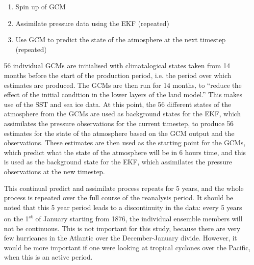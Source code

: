 \documentclass[pdftex,12pt,a4paper]{report}
\newcommand{\ts}{\textsuperscript}
\begin{document}
\begin{enumerate}
    \item Spin up of GCM
    \item Assimilate pressure data using the EKF (repeated)
    \item Use GCM to predict the state of the atmosphere at the next timestep (repeated)
\end{enumerate}

56 individual GCMs are initialised with climatalogical states taken from 14 months before the start
of the production period, i.e. the period over which estimates are produced. The GCMs are then run
for 14 months, to ``reduce the effect of the initial condition in the lower layers of the land
model.'' This makes use of the SST and sea ice data. At this point, the 56 different states of the
atmosphere from the GCMs are used as background states for the EKF, which assimilates the pressure
observations for the current timestep, to produce 56 estimates for the state of the atmosphere based
on the GCM output and the observations. These estimates are then used as the starting point for the
GCMs, which predict what the state of the atmosphere will be in 6 hours time, and this is used as
the background state for the EKF, which assimilates the pressure observations at the new timestep. 

This continual predict and assimilate process repeats for 5 years, and the whole process is repeated
over the full course of the reanalysis period. It should be noted that this 5 year period leads to a
discontinuity in the data: every 5 years on the 1\ts{st} of January starting from 1876, the
individual ensemble members will not be continuous. This is not important for this study, because
there are very few hurricanes in the Atlantic over the December-January divide. However, it would be
more important if one were looking at tropical cyclones over the Pacific, when this is an active
period.
\end{document}

